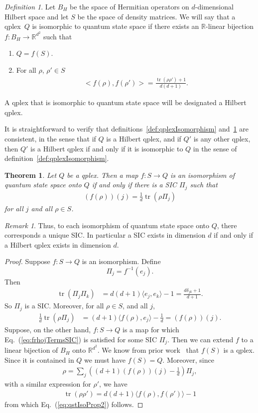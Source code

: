 \documentclass[aps,pra,superscriptaddress,10pt,tightenlines,twocolumn,nofootinbib]{revtex4}
\newtheorem{theorem}{Theorem}
\theoremstyle{remark}
\newtheorem*{remark}{Remark}
\newtheorem{definition}{Definition}
\newcommand{\be}{\begin{equation}}
\newcommand{\ee}{\end{equation}}
\newcommand{\ea}[1]{\begin{align}#1\end{align}}
\newcommand{\fd}[1]{\mathbb{#1}}
\newcommand{\la}{\langle}
\newcommand{\ra}{\rangle}
\newcommand{\qp}{Q}
\newcommand{\qplex}{qplex}
\newcommand{\herm}{B_H}
\newcommand{\dens}{S}
\DeclareMathOperator{\Tr}{tr}
\begin{document}
\begin{definition}
\label{def:qstpIsomorphism}
Let $\herm$ be the space of Hermitian operators on $d$-dimensional Hilbert space  and let $\dens$ be the space of density matrices.  We will say that a \qplex\ $\qp$ is isomorphic to quantum state space if there exists an $\fd{R}$-linear bijection $f\colon \herm \to \fd{R}^{d^2}$  such that
\begin{enumerate}
\item $\qp = f(\dens)$.
\item For all $\rho$, $\rho'\in \dens$
\ea{
\bigl< f(\rho), f(\rho')\bigr>=\frac{ \Tr(\rho \rho') +1 }{d(d+1)}.
\label{eq:qstIsoProp2}
}
\end{enumerate}
A qplex that is isomorphic to quantum state space will be designated a Hilbert qplex.
\end{definition}
It is straightforward to verify that definitions~\ref{def:qplexIsomorphism} and~\ref{def:qstpIsomorphism} are consistent, in the sense that if $\qp$ is a Hilbert qplex, and if $\qp'$ is any other \qplex, then $\qp'$ is a Hilbert qplex if and only if it is isomorphic to $\qp$ in the sense of definition~\ref{def:qplexIsomorphism}.
\begin{theorem}
Let $\qp$ be a \qplex.  Then a map $f\colon \dens \to \qp$ is an isomorphism of quantum state space onto $\qp$ if and only if there is a SIC $\Pi_j$ such that
\ea{
(f(\rho))(j) = \frac{1}{d} \Tr(\rho \Pi_j)
\label{eq:frhojTermsSIC}
}
for all $j$ and all $\rho\in \dens$.
\end{theorem}
\begin{remark}
Thus, to each isomorphism of quantum state space onto $\qp$, there corresponds a unique SIC.  In particular a SIC exists in dimension $d$ if and only if a Hilbert qplex exists in dimension $d$.
\end{remark}
\begin{proof}
Suppose $f\colon S\to \qp$ is an isomorphism.  Define
\be
\Pi_j = f^{-1}(e_j).
\ee
Then
\ea{
\Tr(\Pi_j\Pi_k) & = d(d+1)\la e_j, e_k \ra -1
=\frac{d\delta_{jk} + 1}{d+1}.
}
So $\Pi_j$ is a SIC.  Moreover, for all $\rho\in \dens$, and all $j$,
\ea{
\frac{1}{d} \Tr(\rho \Pi_j) &= (d+1) \la f(\rho), e_j\ra -\frac{1}{d}
= (f(\rho))(j).
}
Suppose, on the other hand, $f\colon S\to \qp$ is a map for which Eq.~(\ref{eq:frhojTermsSIC}) is satisfied for some SIC $\Pi_j$.  Then we can extend $f$ to a linear bijection of $\herm$ onto $\fd{R}^{d^2}$.  We know from prior work~\cite{fuchs2009, appleby2011, fuchs2013} that  $f(S)$ is a \qplex.  Since it is contained in $\qp$ we must have $f(S) = \qp$.  Moreover, since
\ea{
\rho = \sum_j \left( (d+1) (f(\rho))(j) -\frac{1}{d}\right) \Pi_j,
}
with a similar expression for $\rho'$, we have
\ea{
\Tr(\rho \rho') = d(d+1) \la f(\rho), f(\rho') \ra -1
}
from which Eq.~(\ref{eq:qstIsoProp2}) follows.
\end{proof}
\end{document}
